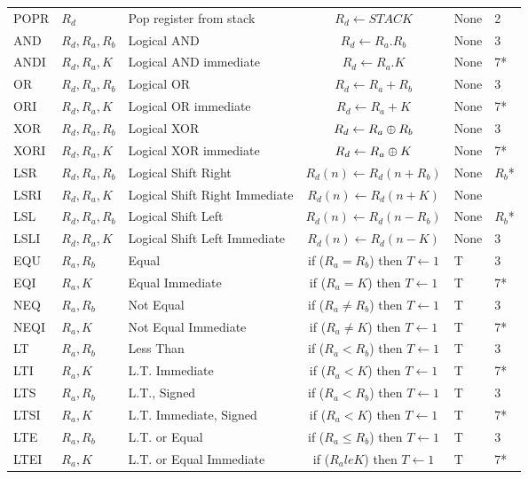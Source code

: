 \documentclass[12pt,twoside]{report}
\begin{document}
{\begin{longtable}{ | l | l | l | c | l | l | }
POPR & $R_d$ & Pop register from stack & $R_d \leftarrow STACK$ & None & 2 \\
AND & $R_d, R_a, R_b$ & Logical AND & $R_d \leftarrow R_a . R_b $ & None & 3 \\
ANDI & $R_d, R_a, K$ & Logical AND immediate & $R_d \leftarrow R_a . K$ & None & 7* \\
OR & $R_d, R_a, R_b$ & Logical OR & $R_d \leftarrow R_a + R_b $ & None & 3 \\
ORI & $R_d, R_a, K$ & Logical OR immediate & $R_d \leftarrow R_a + K $ & None & 7* \\
XOR & $R_d, R_a, R_b$ & Logical XOR & $R_d \leftarrow R_a \mathbin{\oplus} R_b $ & None & 3 \\
XORI & $R_d, R_a, K$ & Logical XOR immediate & $R_d \leftarrow R_a \mathbin{\oplus} K $ & None & 7* \\
LSR & $R_d, R_a, R_b$ & Logical Shift Right & $R_d(n) \leftarrow R_d(n + R_b) $ & None & $R_b$* \\
LSRI & $R_d, R_a, K$ & Logical Shift Right Immediate & $R_d(n) \leftarrow R_d(n + K) $ & None &  \\
LSL & $R_d, R_a, R_b$ & Logical Shift Left & $R_d(n) \leftarrow R_d(n - R_b) $ & None & $R_b$* \\
LSLI & $R_d, R_a, K$ & Logical Shift Left Immediate & $R_d(n) \leftarrow R_d(n - K) $ & None & 3 \\
EQU & $R_a, R_b$ & Equal & if ($R_a = R_b$) then $T \leftarrow 1$ & T & 3 \\
EQI & $R_a, K$ & Equal Immediate & if ($R_a = K$) then $T \leftarrow 1$ & T & 7* \\
NEQ & $R_a, R_b$ & Not Equal & if ($R_a \neq R_b$) then $T \leftarrow 1$ & T & 3 \\
NEQI & $R_a, K$ & Not Equal Immediate & if ($R_a \neq K$) then $T \leftarrow 1$ & T & 7* \\
LT & $R_a, R_b$ & Less Than & if ($R_a < R_b$) then $T \leftarrow 1$ & T & 3 \\
LTI & $R_a, K$ & L.T. Immediate & if ($R_a < K$) then $T \leftarrow 1$ & T & 7* \\
LTS & $R_a, R_b$ & L.T., Signed & if ($R_a < R_b$) then $T \leftarrow 1$ & T & 3 \\
LTSI & $R_a, K$ & L.T. Immediate, Signed & if ($R_a < K$) then $T \leftarrow 1$ & T & 7* \\
LTE & $R_a, R_b$ & L.T. or Equal & if ($R_a \le R_b$) then $T \leftarrow 1$ & T & 3 \\
LTEI & $R_a, K$ & L.T. or Equal Immediate & if ($R_a le K$) then $T \leftarrow 1$ & T & 7* \\

\end{longtable}}
\end{document}
